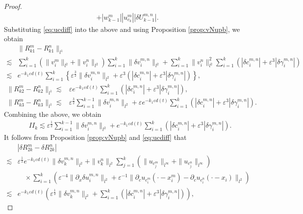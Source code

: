 \documentclass[11pt]{amsart}
\theoremstyle{remark}
\numberwithin{equation}{section}
\begin{document}
\begin{proof}
\begin{align}
+|w_{k-1}^m||u_{c_k}^m||{\delta U}_{k-1}^{m,n}|.
\end{align}
Substituting \eqref{eq:ucdiff} into the above and using Proposition
\ref{prop:vNupb}, we obtain
\begin{align*}
& \|R_{k1}^m-R_{k1}^n\|_{l^1}\\ \lesssim  & 
\sum_{i=1}^k(\|v_i^m\|_{l^2}+\|v_i^n\|_{l^2})\sum_{i=1}^k\|{\delta v}_i^{m,n}\|_{l^2}
+\sum_{i=1}^k\|v_i^n\|_{l^2}^2\sum_{i=1}^k(|{\delta c}^{m,n}_i|+{\varepsilon}^3|{\delta\gamma}^{m,n}_i|)
\\ \lesssim &
e^{-k_1{\varepsilon} d(t)}\sum_{i=1}^k\left\{{\varepsilon}^{\frac32}\|{\delta v}_i^{m,n}\|_{l^2}
+{\varepsilon}^3(|{\delta c}^{m,n}_i|+{\varepsilon}^3|{\delta\gamma}^{m,n}_i|)\right\},
\end{align*}
\begin{align*}
\|R_{k2}^m-R_{k2}^n\|_{l^1}\lesssim & 
{\varepsilon} e^{-k_1{\varepsilon} d(t)}\sum_{i=1}^k(|{\delta c}^{m,n}_i|+{\varepsilon}^3|{\delta\gamma}^{m,n}_i|),\\
\|R_{k3}^m-R_{k3}^n\|_{l^1}\lesssim &
{\varepsilon}^{\frac32}\sum_{i=1}^{k-1}\|{\delta v}_i^{m,n}\|_{l^2}
+{\varepsilon} e^{-k_1{\varepsilon} d(t)}\sum_{i=1}^{k}(|{\delta c}^{m,n}_i|+{\varepsilon}^3|{\delta\gamma}^{m,n}_i|).
\end{align*}
Combining the above, we obtain
\begin{align}
  \label{eq:lemxc2}
& II_{k} \lesssim {\varepsilon}^{\frac12}\sum_{i=1}^{k-1}\|{\delta v}_i^{m,n}\|_{l^2}
+e^{-k_1{\varepsilon} d(t)}\sum_{i=1}^k(|{\delta c}^{m,n}_i|+{\varepsilon}^3|{\delta\gamma}^{m,n}_i|).
\end{align}
It follows from Proposition \ref{prop:vNupb} and \eqref{eq:ucdiff} that
\begin{equation}
  \label{eq:lemxc4}
  \begin{split}
& |\delta R_{2k}^m-\delta R_{2k}^n| \\  \lesssim &
{\varepsilon}^{\frac12}e^{-k_1{\varepsilon} d(t)}\|{\delta v}_k^{m,n}\|_{l^2}
+\|v_k^n\|_{l^2}\sum_{j=1}^k(\|u_{c_j^m}\|_{l^\infty}+\|u_{c_j^n}\|_{l^\infty})
\\ & \quad \times
\sum_{i=1}^k({\varepsilon}^{-4}\|{\partial}_x{\delta u}_i^{m,n}\|_{l^2}+{\varepsilon}^{-1}\|{\partial}_cu_{c_i^m}(\cdot-x_i^m)
-{\partial}_cu_{c_i^n}(\cdot-x_i)\|_{l^2})
\\  \lesssim & e^{-k_1{\varepsilon} d(t)}
\left({\varepsilon}^{\frac12}\|{\delta v}_k^{m,n}\|_{l^2}+\sum_{i=1}^k(|{\delta c}^{m,n}_i|+{\varepsilon}^3|{\delta\gamma}^{m,n}_i|)\right),

\end{split}
\end{equation}
\end{proof}
\end{document}

